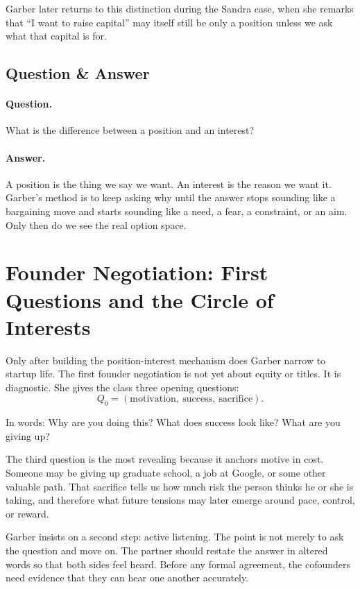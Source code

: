 Garber later returns to this distinction during the Sandra case, when she remarks that ``I want to raise capital'' may itself still be only a position unless we ask what that capital is for.

\subsection{Question \& Answer}

\paragraph{Question.} What is the difference between a position and an interest?

\paragraph{Answer.} A position is the thing we say we want. An interest is the reason we want it. Garber's method is to keep asking why until the answer stops sounding like a bargaining move and starts sounding like a need, a fear, a constraint, or an aim. Only then do we see the real option space.

\section{Founder Negotiation: First Questions and the Circle of Interests}

Only after building the position-interest mechanism does Garber narrow to startup life. The first founder negotiation is not yet about equity or titles. It is diagnostic. She gives the class three opening questions:
\begin{equation}
Q_0 = (\text{motivation},\ \text{success},\ \text{sacrifice}).
\end{equation}

In words: Why are you doing this? What does success look like? What are you giving up?

The third question is the most revealing because it anchors motive in cost. Someone may be giving up graduate school, a job at Google, or some other valuable path. That sacrifice tells us how much risk the person thinks he or she is taking, and therefore what future tensions may later emerge around pace, control, or reward.

Garber insists on a second step: active listening. The point is not merely to ask the question and move on. The partner should restate the answer in altered words so that both sides feel heard. Before any formal agreement, the cofounders need evidence that they can hear one another accurately.

